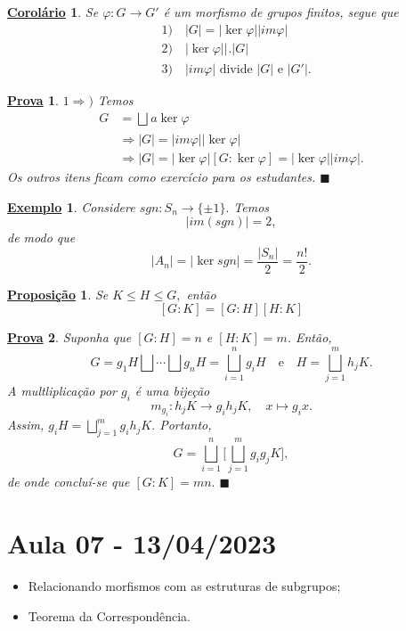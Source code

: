 \documentclass{article}
\newtheorem*{prop*}{\underline{Proposi\c c\~ao}}
\newtheorem*{crl*}{\underline{Corol\'ario}}
\newtheorem{example*}{\underline{Exemplo}}
\newtheorem*{proof*}{\underline{Prova}}
\renewcommand\qedsymbol{$\blacksquare$}
\begin{document}
\begin{crl*}
  Se $\varphi:G\rightarrow G'$ \'e um morfismo de grupos finitos, segue que 
 \begin{align*}
   &1)\quad |G| = |\ker{\varphi}||im\varphi|\\
   &2)\quad |\ker{\varphi}| \biggl|_{}^{}\biggr. |G|\\
   &3)\quad |im\varphi|\text{ divide } |G|\text{ e }|G'|.
 \end{align*}
\end{crl*}
\begin{proof*}
  $1\Rightarrow)$ Temos 
 \begin{align*}
   G &= \bigsqcup_{}^{}{a\ker{\varphi}}\\
     & \Rightarrow |G| = |im\varphi||\ker{\varphi}|\\
     & \Rightarrow |G| = |\ker\varphi|[G:\ker{\varphi}] = |\ker{\varphi}||im\varphi|.
 \end{align*}
  Os outros itens ficam como exerc\'icio para os estudantes. \qedsymbol
\end{proof*}
\begin{example*}
  Considere $sgn:S_{n}\rightarrow \{\pm 1\}.$ Temos 
    $$
      |im(sgn)| = 2,
    $$
    de modo que 
    $$
    |A_{n}| = |\ker{sgn}| = \frac{|S_{n}|}{2} = \frac{n!}{2}.
    $$
\end{example*}
\begin{prop*}
  Se $K\leq{H}\leq{G},$ ent\~ao 
    $$
    [G:K] = [G:H][H:K] 
    $$ 
\end{prop*}
\begin{proof*}
  Suponha que $[G:H] = n$ e $[H:K]=m$. Ent\~ao, 
    $$
    G = g_{1}H\bigsqcup_{}^{}{\cdots}\bigsqcup_{}^{}{g_{n}H} = \bigsqcup_{i=1}^{n}{g_{i}H}\quad\text{e}\quad H = \bigsqcup_{j=1}^{m}{h_{j}K}.
    $$
  A multliplica\c c\~ao por $g_{i}$ \'e uma bije\c c\~ao 
    $$
      m_{g_{i}}:h_{j}K\rightarrow g_{i}h_{j}K,\quad x\mapsto g_{i}x.
    $$
  Assim, $g_{i}H = \bigsqcup_{j=1}^{m}{g_{i}h_{j}K}.$ Portanto, 
    $$
    G = \bigsqcup_{i=1}^{n}{\biggl[\bigsqcup_{j=1}^{m}{g_{i}g_{j}K}\biggr]},
    $$
    de onde conclu\'i-se que $[G:K]=mn.$ \qedsymbol
\end{proof*}
\newpage

\section{Aula 07 - 13/04/2023}
\begin{itemize}
  \item Relacionando morfismos com as estruturas de subgrupos;
  \item Teorema da Correspond\^encia.
\end{itemize}
\end{document}
